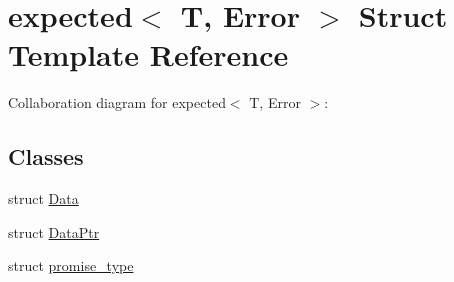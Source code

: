 \hypertarget{structexpected}{}\section{expected$<$ T, Error $>$ Struct Template Reference}
\label{structexpected}


Collaboration diagram for expected$<$ T, Error $>$\+:
\subsection*{Classes}
\begin{DoxyCompactItemize}
\item 
struct \mbox{\hyperlink{structexpected_1_1_data}{Data}}
\item 
struct \mbox{\hyperlink{structexpected_1_1_data_ptr}{Data\+Ptr}}
\item 
struct \mbox{\hyperlink{structexpected_1_1promise__type}{promise\+\_\+type}}
\end{DoxyCompactItemize}
